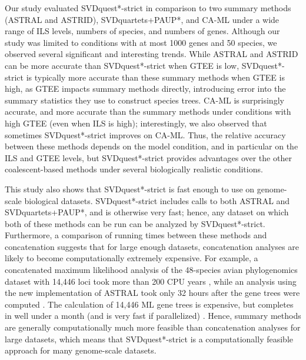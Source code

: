 Our study evaluated SVDquest*-strict in comparison to two summary methods (ASTRAL and ASTRID), 
SVDquartets+PAUP*, and CA-ML under a wide range of ILS levels, numbers of species, and numbers of genes.
Although our study was limited to conditions with at most 1000 genes and 50 species, we observed
several significant and interesting trends. 
While ASTRAL and ASTRID can be more accurate than
SVDquest*-strict when GTEE is low, 
SVDquest*-strict is typically more accurate than these summary methods when GTEE is high, as GTEE impacts
summary methods directly, introducing error into the summary statistics they use to construct species trees.
CA-ML is surprisingly accurate, and more accurate than
the summary methods under conditions with high GTEE (even when ILS is high);
interestingly,  we also observed that sometimes SVDquest*-strict improves on CA-ML.
Thus, the relative accuracy between these methods depends on the model condition, and in particular on the ILS 
and GTEE levels, but SVDquest*-strict provides advantages over the other coalescent-based methods under 
several biologically realistic conditions. 

This study also shows  that SVDquest*-strict is fast enough to use on  genome-scale biological 
datasets. 
SVDquest*-strict includes calls to  both ASTRAL  and SVDquartets+PAUP*, and is otherwise very fast; 
hence, any dataset on which both of these methods can be run can be analyzed by SVDquest*-strict.
Furthermore, a comparison of running times between these methods and concatenation  suggests that
for large enough datasets, concatenation analyses are likely to become computationally extremely expensive. 
For example,  a concatenated maximum
likelihood analysis of the 48-species avian phylogenomics dataset with 14,446 loci took more than 200 CPU years \cite{jarvis2014whole}, while
an analysis using the new implementation of ASTRAL took only 32 hours after the gene trees were computed \cite{astral3}.
The calculation of 14,446 ML gene trees is expensive, but completes in well under a month (and is very fast if
parallelized) \cite{jarvis2014whole}.
Hence, summary methods are generally computationally much more feasible than concatenation analyses for large
datasets, which means that SVDquest*-strict is a computationally feasible approach for many  genome-scale datasets.
 
